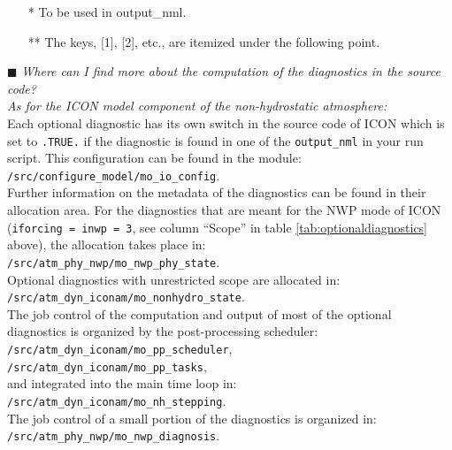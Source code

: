 \renewcommand*{\arraystretch}{1.}
%
\begin{itemize}
\setlength\itemsep{-0.3em}
\item[*]  To be used in output\_nml.
\item[**] The keys, {[1]}, {[2]}, etc., are itemized under the following point.
\end{itemize}
%

$\blacksquare$ \emph{Where can I find more about the computation of the diagnostics in the source code?} \\

\emph{As for the ICON model component of the non-hydrostatic atmosphere:}\\

Each optional diagnostic has its own switch in the source code of ICON 
which is set to \texttt{.TRUE.} if the diagnostic is found in one of the \texttt{output\_nml} in your run script. 
This configuration can be found in the module: \\
\texttt{/src/configure\_model/mo\_io\_config}. \\

Further information on the metadata of the diagnostics can be found 
in their allocation area. 
For the diagnostics that are meant for the NWP mode of ICON 
(\texttt{iforcing = inwp = 3}, see column ``Scope'' in table \ref{tab:optionaldiagnostics} above), 
the allocation takes place in:\\
\texttt{/src/atm\_phy\_nwp/mo\_nwp\_phy\_state}.\\
Optional diagnostics with unrestricted scope are allocated in:\\
\texttt{/src/atm\_dyn\_iconam/mo\_nonhydro\_state}.\\

The job control of the computation and output of most of the optional diagnostics 
is organized by the post-processing scheduler:\\
\texttt{/src/atm\_dyn\_iconam/mo\_pp\_scheduler}, \\
\texttt{/src/atm\_dyn\_iconam/mo\_pp\_tasks}, \\
and integrated into the main time loop in:\\
\texttt{/src/atm\_dyn\_iconam/mo\_nh\_stepping}.\\
The job control of a small portion of the diagnostics 
is organized in: \\
\texttt{/src/atm\_phy\_nwp/mo\_nwp\_diagnosis}.\\

